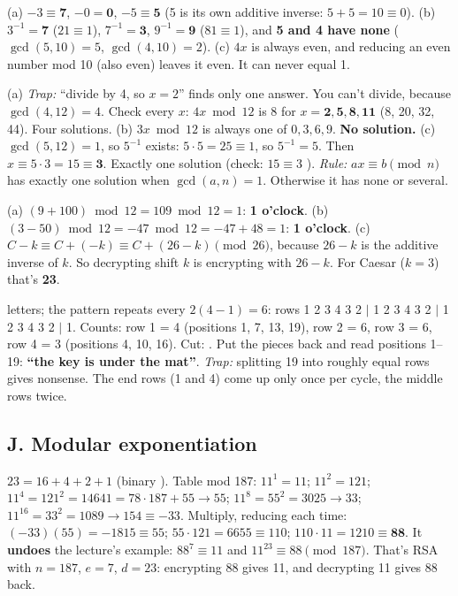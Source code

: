 \ans (a) $-3 \equiv \mathbf{7}$, $-0 = \mathbf{0}$, $-5 \equiv \mathbf{5}$ (5 is its own additive inverse: $5 + 5 = 10 \equiv 0$).
(b) $3^{-1} = \mathbf{7}$ ($21 \equiv 1$), $7^{-1} = \mathbf{3}$, $9^{-1} = \mathbf{9}$ ($81 \equiv 1$), and \textbf{5 and 4 have none} ($\gcd(5,10) = 5$, $\gcd(4,10) = 2$).
(c) $4x$ is always even, and reducing an even number mod 10 (also even) leaves it even. It can never equal 1.

\ans (a) \emph{Trap:} ``divide by 4, so $x = 2$'' finds only one answer. You can't divide, because $\gcd(4,12) = 4$. Check every $x$: $4x \bmod 12$ is $8$ for $x = \mathbf{2, 5, 8, 11}$ (8, 20, 32, 44). Four solutions.
(b) $3x \bmod 12$ is always one of $0, 3, 6, 9$. \textbf{No solution.}
(c) $\gcd(5,12) = 1$, so $5^{-1}$ exists: $5\cdot5 = 25 \equiv 1$, so $5^{-1} = 5$. Then $x \equiv 5 \cdot 3 = 15 \equiv \mathbf{3}$. Exactly one solution (check: $15 \equiv 3$ \checkmark).
\emph{Rule:} $ax \equiv b \pmod n$ has exactly one solution when $\gcd(a,n) = 1$. Otherwise it has none or several.

\ans (a) $(9 + 100) \bmod 12 = 109 \bmod 12 = 1$: \textbf{1 o'clock}.
(b) $(3 - 50) \bmod 12 = -47 \bmod 12 = -47 + 48 = 1$: \textbf{1 o'clock}.
(c) $C - k \equiv C + (-k) \equiv C + (26 - k) \pmod{26}$, because $26 - k$ is the additive inverse of $k$. So decrypting shift $k$ is encrypting with $26 - k$. For Caesar ($k = 3$) that's \textbf{23}.

 letters; the pattern repeats every $2(4-1) = 6$: rows 1 2 3 4 3 2 $|$ 1 2 3 4 3 2 $|$ 1 2 3 4 3 2 $|$ 1.
Counts: row 1 = 4 (positions 1, 7, 13, 19), row 2 = 6, row 3 = 6, row 4 = 3 (positions 4, 10, 16).
Cut: . Put the pieces back and read positions 1--19: \textbf{``the key is under the mat''}.
\emph{Trap:} splitting 19 into roughly equal rows gives nonsense. The end rows (1 and 4) come up only once per cycle, the middle rows twice.

\subsection*{J. Modular exponentiation}

\ans $23 = 16 + 4 + 2 + 1$ (binary ). Table mod 187:
$11^1 = 11$; \;$11^2 = 121$; \;$11^4 = 121^2 = 14641 = 78\cdot187 + 55 \to 55$; \;$11^8 = 55^2 = 3025 \to 33$; \;$11^{16} = 33^2 = 1089 \to 154 \equiv -33$.
Multiply, reducing each time: $(-33)(55) = -1815 \equiv 55$; \;$55 \cdot 121 = 6655 \equiv 110$; \;$110 \cdot 11 = 1210 \equiv \mathbf{88}$.
It \textbf{undoes} the lecture's example: $88^7 \equiv 11$ and $11^{23} \equiv 88 \pmod{187}$. That's RSA with $n = 187$, $e = 7$, $d = 23$: encrypting 88 gives 11, and decrypting 11 gives 88 back.

